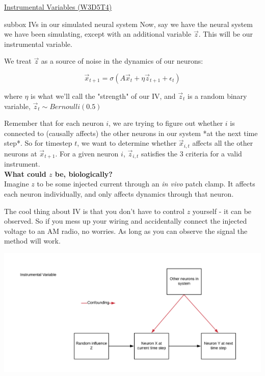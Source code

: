 \begin{textbox}{\href{https://compneuro.neuromatch.io/tutorials/W3D5_NetworkCausality/student/W3D5_Tutorial4.html}{Instrumental Variables (W3D5T4)}   }
\begin{subbox}{subbox}{ IVs in our simulated neural system
}
\scriptsize
Now, say we have the neural system we have been simulating, except with an additional variable $\vec{z}$. This will be our instrumental variable. 

We treat $\vec{z}$ as a source of noise in the dynamics of our neurons:

\begin{equation}
\vec{x}_{t+1} = \sigma(A\vec{x}_t + \eta \vec{z}_{t+1} + \epsilon_t)
\end{equation}

where $\eta$ is what we'll call the "strength" of our IV, and $\vec{z}_t$ is a random binary variable, $\vec{z}_t \sim Bernoulli(0.5)$

Remember that for each neuron $i$, we are trying to figure out whether $i$ is connected to (causally affects) the other neurons in our system *at the next time step*. So for timestep $t$, we want to determine whether $\vec{x}_{i,t}$ affects all the other neurons at $\vec{x}_{t+1}$. For a given neuron $i$, $\vec{z}_{i,t}$ satisfies the 3 criteria for a valid instrument. \\

\textbf{What could $z$ be, biologically?}\\

Imagine $z$ to be some injected current through an \textit{in vivo} patch clamp. It affects each neuron individually, and only affects dynamics through that neuron.

The cool thing about IV is that you don't have to control $z$ yourself - it can be observed. So if you mess up your wiring and accidentally connect the injected voltage to an AM radio, no worries. As long as you can observe the signal the method will work.
\begin{center}
    
\includegraphics[scale=0.1]{Figures/NC/NC_Figure19.png}


\end{center}
\end{subbox}
\end{textbox}
